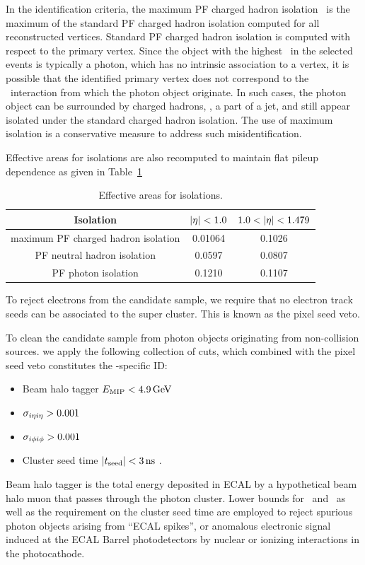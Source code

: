 In the identification criteria, the maximum PF charged hadron isolation \ICHmax\ is the maximum of the standard PF charged hadron isolation computed for all reconstructed vertices. 
Standard PF charged hadron isolation is computed with respect to the primary vertex. 
Since the object with the highest \pt\ in the selected events is typically a photon, which has no intrinsic association to a vertex, it is possible that the identified primary vertex does not correspond to the \Pp\Pp\ interaction from which the photon object originate. 
In such cases, the photon object can be surrounded by charged hadrons, \ie, a part of a jet, and still appear isolated under the standard charged hadron isolation. 
The use of maximum isolation is a conservative measure to address such misidentification.

Effective areas for isolations are also recomputed to maintain flat pileup dependence as given in Table~\ref{tab:ea}
%
\begin{table}[htbp]
  \begin{center}
    \caption{Effective areas for isolations.} 
    \label{tab:ea}
    \begin{tabular}{|c|c|c|}
      \hline
      Isolation & $\lvert \eta \rvert < 1.0$ & $1.0 < \lvert \eta \rvert < 1.479$  \\
      \hline
      maximum PF charged hadron isolation & 0.01064& 0.1026 \\
      PF neutral hadron isolation & 0.0597 & 0.0807 \\
      PF photon isolation & 0.1210 & 0.1107 \\
      \hline
    \end{tabular}
  \end{center}
\end{table}

To reject electrons from the candidate sample, we require that no electron track seeds can be associated to the super cluster. This is known as the pixel seed veto.

To clean the candidate sample from photon objects originating from non-collision sources. we apply the following collection of cuts, which combined with the pixel seed veto constitutes the \Pgg-specific ID:
\begin{itemize} 
  \item Beam halo tagger $E_{\mathrm{MIP}} < 4.9\,\text{Ge\hspace{-.08em}V}$
  \item $\sigma_{i\eta i\eta} > 0.001$
  \item $\sigma_{i\phi i\phi} > 0.001$
  \item Cluster seed time $\lvert t_{\mathrm{seed}} \rvert < 3\, \text{ns}$ .
\end{itemize}
Beam halo tagger is the total energy deposited in ECAL by a hypothetical beam halo muon that passes through the photon cluster. 
Lower bounds for \sieie\ and \sipip\ as well as the requirement on the cluster seed time are employed to reject spurious photon objects arising from ``ECAL spikes'', or anomalous electronic signal induced at the ECAL Barrel photodetectors by nuclear or ionizing interactions in the photocathode.

